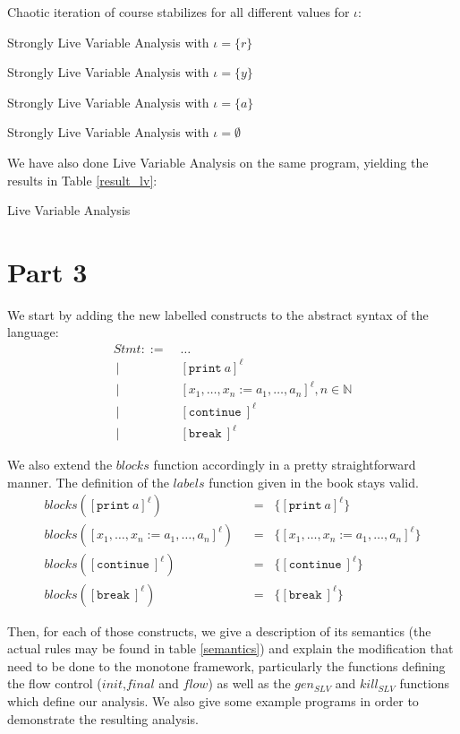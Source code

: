 \documentclass[a4wide,12pt]{article}
\def\eq{\;\; = \;\;}
\def\N{\mathbb{N}}
\def\print{\texttt{print}\ }
\def\cont {\texttt{continue}\ }
\def\breakc{\texttt{break}\ }
\def\restabR#1#2[#3]{\begin{table}\label{#3}\begin{center}\caption{#1}\begin{sideways}\end{sideways}\end{center}\end{table}}
\def\restab#1#2[#3]{\begin{table}\label{#3}\begin{center}\caption{#1}\end{center}\end{table}}
\begin{document}
Chaotic iteration of course stabilizes for all different values for $\iota$:
 
\restabR{Strongly Live Variable Analysis with $\iota = \{r\}$}{resultr.tex}[resultr]

\restab{Strongly Live Variable Analysis with $\iota = \{y\}$}{resulty.tex}[resulty]

\restab{Strongly Live Variable Analysis with $\iota = \{a\}$}{resulta.tex}[resulta]

\restab{Strongly Live Variable Analysis with $\iota = \emptyset$}{resultempty.tex}[resultempty]

We have also done Live Variable Analysis on the same program,
yielding the results in Table \ref{result_lv}:

\restab{Live Variable Analysis}{result1_lv.tex}[result_lv]

 
\section{Part 3}
 
We start by adding the new labelled constructs to the abstract syntax of the language:
\begin{align*}
 Stmt ::= \; & \ldots \\
 ~ |\;\; & [\print a]^\ell \\
 ~ |\;\; & [x_1,\ldots,x_n := a_1,\ldots,a_n]^\ell , n \in \N \\
 ~ |\;\; & [\cont]^\ell \\
 ~ |\;\; & [\breakc]^\ell
\end{align*}
 
We also extend the $blocks$ function accordingly in a pretty straightforward manner. The definition
of the $labels$ function given in the book stays valid.
\begin{align*}
 blocks([\print a]^\ell) & \eq \{[\print a]^\ell\} \\
 blocks([x_1,\ldots,x_n := a_1,\ldots,a_n]^\ell) & \eq \{[x_1,\ldots,x_n := a_1,\ldots,a_n]^\ell\} \\
 blocks([\cont]^\ell) & \eq \{[\cont]^\ell\} \\
 blocks([\breakc]^\ell) & \eq \{[\breakc]^\ell\}
\end{align*}
 
 
Then, for each of those constructs, we give a description of its semantics (the actual rules may be found
in table \ref{semantics}) and explain the modification that need to be done
to the monotone framework, particularly the functions defining the flow control
($init$,$final$ and $flow$) as well as the $gen_{SLV}$ and $kill_{SLV}$ functions
which define our analysis. We also give some example
programs in order to demonstrate the resulting analysis.
 
\end{document}
